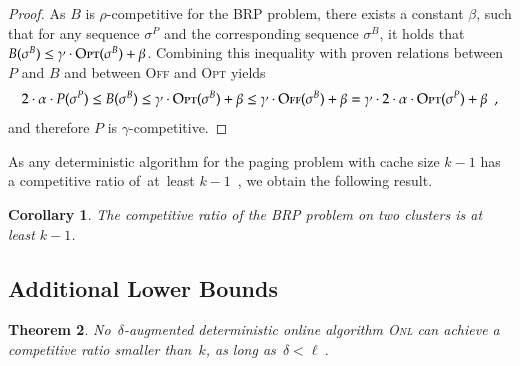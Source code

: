 \documentclass[11pt,a4paper]{scrartcl}
\newtheorem{theorem}{Theorem}
\newtheorem{corollary}[theorem]{Corollary}
\newcommand{\ONL}{\textsc{Onl}\xspace}
\newcommand{\OFF}{\textsc{Off}\xspace}
\newcommand{\OPT}{\textsc{Opt}\xspace}
\begin{document}
\begin{proof}
As $B$ is $\rho$-competitive for the BRP problem, there exists a constant
$\beta$, such that for any sequence $\sigma^P$ and the corresponding sequence
$\sigma^B$, it holds that $B(\sigma^B) \leq \gamma \cdot \OPT(\sigma^B) +
\beta$. Combining this inequality with proven relations between $P$ and $B$
and between \OFF and \OPT yields
\[
	2 \cdot \alpha \cdot P(\sigma^P) \leq 
	B(\sigma^B) \leq \gamma \cdot \OPT(\sigma^B) + \beta
	\leq \gamma \cdot \OFF(\sigma^B) + \beta
	 =\gamma \cdot 2 \cdot \alpha \cdot \OPT(\sigma^P) + \beta
	\enspace,
\]
and therefore $P$ is $\gamma$-competitive.
\end{proof}

As any deterministic algorithm for the paging problem with cache size $k-1$
has a competitive ratio of~at~least $k-1$~\cite{SleTar85}, we obtain the
following result.

\begin{corollary}
The competitive ratio of the BRP problem on two clusters is at least $k-1$. 
\end{corollary}


\subsection{Additional Lower Bounds}
\label{sec:lower-bounds}

\begin{theorem}\label{thm:loweraugmk}
No~$\delta$-augmented deterministic online algorithm \ONL
can achieve a competitive ratio smaller than~$k$, as long as~$\delta < \ell~$.
\end{theorem}
\end{document}
